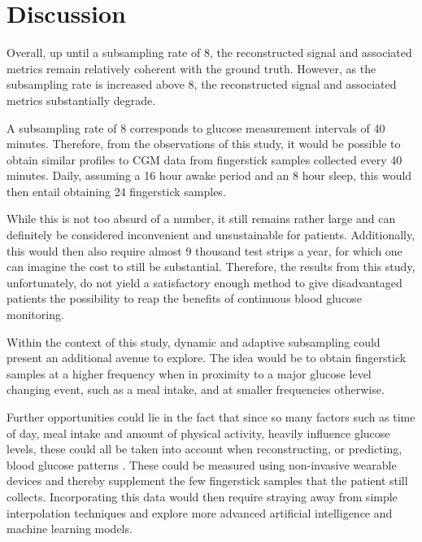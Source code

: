 
\section{Discussion}

Overall, up until a subsampling rate of 8, the reconstructed signal and associated metrics remain relatively coherent with the ground truth. However, as the subsampling rate is increased above 8, the reconstructed signal and associated metrics substantially degrade.

A subsampling rate of 8 corresponds to glucose measurement intervals of 40 minutes. Therefore, from the observations of this study, it would be possible to obtain similar profiles to CGM data from fingerstick samples collected every 40 minutes. Daily, assuming a 16 hour awake period and an 8 hour sleep, this would then entail obtaining 24 fingerstick samples.

While this is not too absurd of a number, it still remains rather large and can definitely be considered inconvenient and unsustainable for patients. Additionally, this would then also require almost 9 thousand test strips a year, for which one can imagine the cost to still be substantial. Therefore, the results from this study, unfortunately, do not yield a satisfactory enough method to give disadvantaged patients the possibility to reap the benefits of continuous blood glucose monitoring.

Within the context of this study, dynamic and adaptive subsampling could present an additional avenue to explore. The idea would be to obtain fingerstick samples at a higher frequency when in proximity to a major glucose level changing event, such as a meal intake, and at smaller frequencies otherwise. 

Further opportunities could lie in the fact that since so many factors such as time of day, meal intake and amount of physical activity, heavily influence glucose levels, these could all be taken into account when reconstructing, or predicting, blood glucose patterns  \cite{noauthor_42_2018}. These could be measured using non-invasive wearable devices and thereby supplement the few fingerstick samples that the patient still collects. Incorporating this data would then require straying away from simple interpolation techniques and explore more advanced artificial intelligence and machine learning models.
